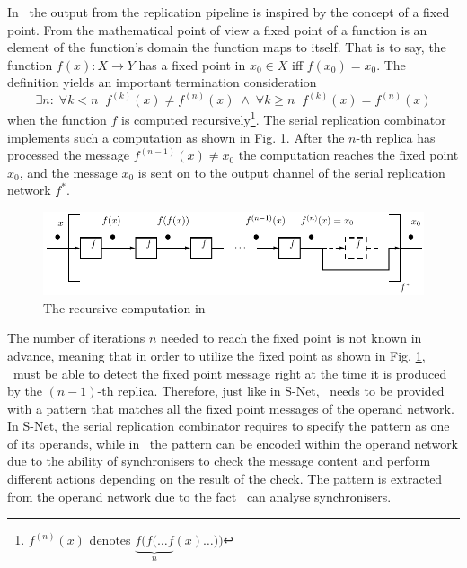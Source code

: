 In \ak\, the output from the replication pipeline is inspired by the concept of a fixed point. From the mathematical point of view a fixed point of a function is an element of the function's domain the function maps to itself. That is to say, the function $f(x): X \to Y$ has a fixed point in $x_0 \in X$ iff $f(x_0) = x_0$. The definition yields an important termination consideration
\begin{equation}
\exists n: \; \forall k<n \;\; f^{(k)}(x) \neq f^{(n)}(x) \; \land \; \forall k \ge n \;\; f^{(k)}(x) = f^{(n)}(x) \nonumber
\end{equation}
when the function $f$ is computed recursively\footnote{$f^{(n)}(x)$ denotes $\underbrace{f(f(\dots f}_n (x) \dots))$}. The serial replication combinator implements such a computation as shown in Fig. \ref{fig:fp}. After the $n$-th replica has processed the message $f^{(n-1)}(x) \neq x_0$ the computation reaches the fixed point $x_0$, and the message $x_0$ is sent on to the output channel of the serial replication network $f^{*}$.
\begin{figure}[h!]
\centering
\includegraphics[scale=0.8]{figs/chapter_03_fp.pdf}
\caption{The recursive computation in \ak\ }
\label{fig:fp}
\end{figure}

The number of iterations $n$ needed to reach the fixed point is not known in advance, meaning that in order to utilize the fixed point as shown in Fig. \ref{fig:fp}, \ak\ must be able to detect the fixed point message right at the time it is produced by the $(n-1)$-th replica. Therefore, just like in S-Net, \ak\ needs to be provided with a pattern that matches all the fixed point messages of the operand network. In S-Net, the serial replication combinator requires to specify the pattern as one of its operands, while in \ak\ the pattern can be encoded within the operand network due to the ability of synchronisers to check the message content and perform different actions depending on the result of the check. The pattern is extracted from the operand network due to the fact \ak\ can analyse synchronisers.

